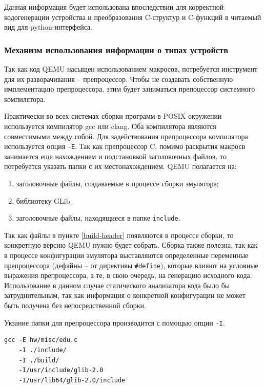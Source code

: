 Данная информация будет использована впоследствии для корректной кодогенерации устройства
и преобразования C-структур и C-функций в читаемый вид для python-интерфейса.

\subsubsection{Механизм использования информации о типах устройств}\label{sec:ch2/sec1/sub2/sub2}

Так как код QEMU насыщен использованием макросов, потребуется инструмент для их разворачивания -- препроцессор.
Чтобы не создавать собственную имплементацию препроцессора, этим будет заниматься препоцессор системного компилятора.

Практически во всех системах сборки программ в POSIX окружении используется компилятор gcc или clang.
Оба компилятора являются совместимыми между собой. Для задействования препроцессора компилятора используется
опция \texttt{-E}. Так как препроцессор C, помимо раскрытия макросв занимается еще нахождением и подстановкой
заголовочных файлов, то потребуется указать папки с их местонахождением.
QEMU полагается на:
\begin{enumerate}[label={\arabic*)}]
    \item \label{build-header} заголовочные файлы, создаваемые в процессе сборки эмулятора;
    \item библиотеку GLib;
    \item заголовочные файлы, находящиеся в папке \texttt{include}.
\end{enumerate}

Так как файлы в пункте \ref{build-header} появляются в процессе сборки, то конкретную версию QEMU нужно будет собрать.
Сборка также полезна, так как в процессе конфигурации эмулятора выставляются определенные переменные
препроцессора (дефайны -- от директивы \texttt{\#define}), которые влияют на условные выражения
препроцессора, а те, в свою очередь, на генерацию исходного кода.
Использование в данном случае статического анализатора кода было бы затруднительным, так как
информация о конкретной конфигурации не может быть получена без непосредственной сборки.

Укзание папки для препроцессора производится с помощью опции \texttt{-I}.
\begin{lstlisting}[caption={Пример строки запуска препроцессора для определенного файла устройства},
                   captionpos=b]
gcc -E hw/misc/edu.c
    -I ./include/
    -I ./build/
    -I/usr/include/glib-2.0
    -I/usr/lib64/glib-2.0/include
\end{lstlisting}


